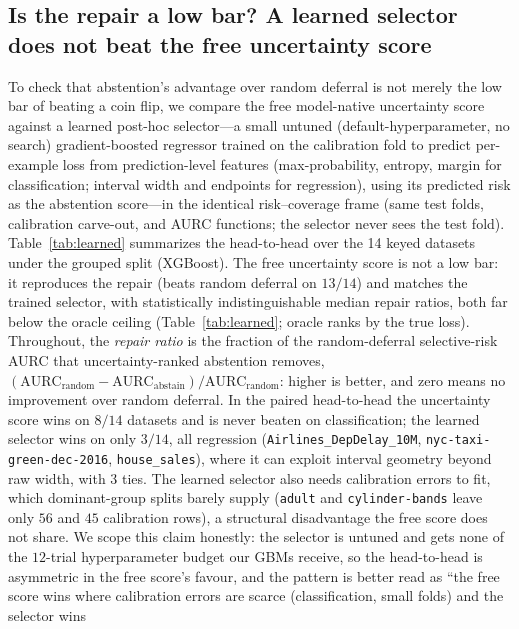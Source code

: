 \documentclass[11pt]{article}
\begin{document}
\subsection*{Is the repair a low bar? A learned selector does not beat the free uncertainty score}
To check that abstention's advantage over random deferral is not merely the low bar of beating a coin flip, we
compare the free model-native uncertainty score against a learned post-hoc selector---a small
untuned (default-hyperparameter, no search) gradient-boosted regressor trained on the calibration fold to predict per-example loss from prediction-level
features (max-probability, entropy, margin for classification; interval width and endpoints for regression),
using its predicted risk as the abstention score---in the identical risk--coverage frame (same test folds,
calibration carve-out, and AURC functions; the selector never sees the test fold). Table~\ref{tab:learned}
summarizes the head-to-head over the 14 keyed datasets under the grouped split (XGBoost). The free uncertainty
score is not a low bar: it reproduces the repair (beats random deferral on $13/14$) and matches
the trained selector, with statistically indistinguishable median repair ratios, both far
below the oracle ceiling (Table~\ref{tab:learned}; oracle ranks by the true loss). Throughout,
the \emph{repair ratio} is the fraction of the random-deferral selective-risk AURC that
uncertainty-ranked abstention removes,
$(\mathrm{AURC}_{\mathrm{random}}-\mathrm{AURC}_{\mathrm{abstain}})/\mathrm{AURC}_{\mathrm{random}}$:
higher is better, and zero means no improvement over random deferral. In the paired head-to-head the uncertainty score
wins on $8/14$ datasets and is never beaten on classification; the learned selector wins on only $3/14$,
all regression (\texttt{Airlines\_DepDelay\_10M}, \texttt{nyc-taxi-green-dec-2016}, \texttt{house\_sales}), where
it can exploit interval geometry beyond raw width, with $3$ ties. The learned selector also needs calibration
errors to fit, which dominant-group splits barely supply (\texttt{adult} and \texttt{cylinder-bands}
leave only $56$ and $45$ calibration rows), a structural disadvantage the free score does not share. We scope
this claim honestly: the selector is untuned and gets none of the $12$-trial hyperparameter budget our
GBMs receive, so the head-to-head is asymmetric in the free score's favour, and the pattern is better read as
``the free score wins where calibration errors are scarce (classification, small folds) and the selector wins
\end{document}
